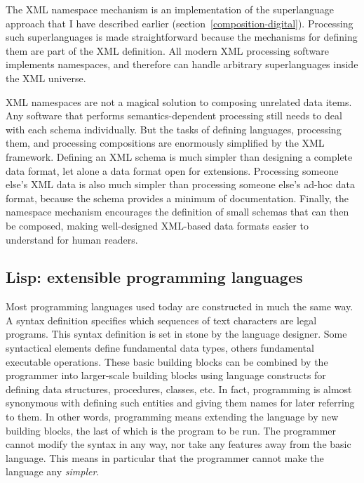 The XML namespace mechanism is an implementation of the superlanguage approach that I have described earlier (section~\ref{composition-digital}). Processing such superlanguages is made straightforward because the mechanisms for defining them are part of the XML definition. All modern XML processing software implements namespaces, and therefore can handle arbitrary superlanguages inside the XML universe.

XML namespaces are not a magical solution to composing unrelated data items. Any software that performs semantics-dependent processing still needs to deal with each schema individually. But the tasks of defining languages, processing them, and processing compositions are enormously simplified by the XML framework. Defining an XML schema is much simpler than designing a complete data format, let alone a data format open for extensions. Processing someone else's XML data is also much simpler than processing someone else's ad-hoc data format, because the schema provides a minimum of documentation. Finally, the namespace mechanism encourages the definition of small schemas that can then be composed, making well-designed XML-based data formats easier to understand for human readers.

\subsection{Lisp: extensible programming languages}
\label{lisp}

Most programming languages used today are constructed in much the same way. A syntax definition specifies which sequences of text characters are legal programs. This syntax definition is set in stone by the language designer. Some syntactical elements define fundamental data types, others fundamental executable operations. These basic building blocks can be combined by the programmer into larger-scale building blocks using language constructs for defining data structures, procedures, classes, etc. In fact, programming is almost synonymous with defining such entities and giving them names for later referring to them. In other words, programming means extending the language by new building blocks, the last of which is the program to be run. The programmer cannot modify the syntax in any way, nor take any features away from the basic language. This means in particular that the programmer cannot make the language any \textit{simpler}.

